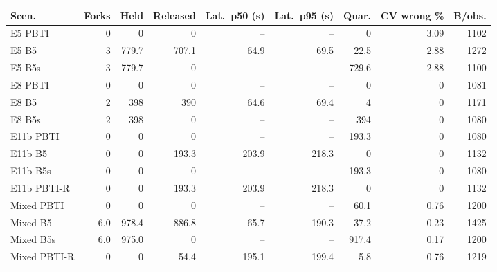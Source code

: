 \begin{tabular}{lrrrrrrrr}
\toprule
\textbf{Scen.} & \textbf{Forks} & \textbf{Held} & \textbf{Released} & \textbf{Lat.\ p50 (s)} & \textbf{Lat.\ p95 (s)} & \textbf{Quar.} & \textbf{CV wrong \%} & \textbf{B/obs.}\\
\midrule
E5 PBTI & 0 & 0 & 0 & -- & -- & 0 & 3.09 & 1102\\
E5 B5 & 3 & 779.7 & 707.1 & 64.9 & 69.5 & 22.5 & 2.88 & 1272\\
E5 B5s & 3 & 779.7 & 0 & -- & -- & 729.6 & 2.88 & 1100\\
E8 PBTI & 0 & 0 & 0 & -- & -- & 0 & 0 & 1081\\
E8 B5 & 2 & 398 & 390 & 64.6 & 69.4 & 4 & 0 & 1171\\
E8 B5s & 2 & 398 & 0 & -- & -- & 394 & 0 & 1080\\
E11b PBTI & 0 & 0 & 0 & -- & -- & 193.3 & 0 & 1080\\
E11b B5 & 0 & 0 & 193.3 & 203.9 & 218.3 & 0 & 0 & 1132\\
E11b B5s & 0 & 0 & 0 & -- & -- & 193.3 & 0 & 1080\\
E11b PBTI-R & 0 & 0 & 193.3 & 203.9 & 218.3 & 0 & 0 & 1132\\
\midrule
Mixed PBTI & 0 & 0 & 0 & -- & -- & 60.1 & 0.76 & 1200\\
Mixed B5 & 6.0 & 978.4 & 886.8 & 65.7 & 190.3 & 37.2 & 0.23 & 1425\\
Mixed B5s & 6.0 & 975.0 & 0 & -- & -- & 917.4 & 0.17 & 1200\\
Mixed PBTI-R & 0 & 0 & 54.4 & 195.1 & 199.4 & 5.8 & 0.76 & 1219\\
\bottomrule
\end{tabular}